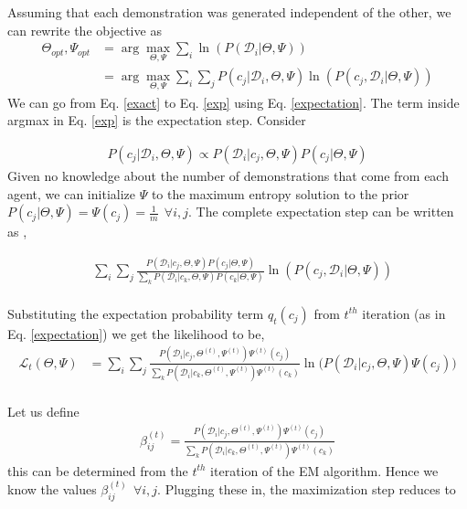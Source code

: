 \documentclass{article}[11pt]
\begin{document}
Assuming that each demonstration was generated independent of the other, we can rewrite the objective as 
\begin{align}
\label{exact}
\Theta_{opt}, \Psi_{opt} &= \arg \max_{\Theta,\Psi} \sum_i \ln( P(\mathcal{D}_i|\Theta,\Psi)) \\
\label{exp}
&= \arg \max_{\Theta,\Psi}\sum_i \sum_j P(c_j|\mathcal{D}_i, \Theta, \Psi) \ln(P(c_j,\mathcal{D}_i|\Theta,\Psi))
\end{align}
We can go from Eq. \ref{exact} to Eq. \ref{exp}  using Eq. \ref{expectation}. The term inside argmax in Eq. \ref{exp} is the expectation step.
Consider 

\begin{align*}
P(c_{j}|\mathcal{D}_i, \Theta,\Psi) \propto P(\mathcal{D}_i| c_{j},\Theta,\Psi)P(c_{j}|\Theta,\Psi)
\end{align*}
Given no knowledge about the number of demonstrations that come from each agent, we can initialize $\Psi$ to the maximum entropy solution to the prior $P(c_{j}|\Theta,\Psi) = \Psi(c_{j})= \frac{1}{m} \ \ \forall i,j $.
The complete expectation step can be written as ,

\begin{align*}
&\sum_i \sum_j \frac{P(\mathcal{D}_i| c_{j},\Theta,\Psi)P(c_{j}|\Theta,\Psi)}{\sum_k P(\mathcal{D}_i| c_{k},\Theta,\Psi)P(c_{k}|\Theta,\Psi)} \ln(P(c_{j},\mathcal{D}_i| \Theta,\Psi))
\end{align*}\\
Substituting the expectation probability term $q_t(c_j)$ from $t^{th}$ iteration (as in Eq. \ref{expectation}) we get the likelihood to be,
\begin{align*}
\mathcal{L}_t(\Theta,\Psi)&=\sum_i \sum_j \frac{P(\mathcal{D}_i| c_{j},\Theta^{(t)},\Psi^{(t)})\Psi^{(t)}(c_{j})}{\sum_k P(\mathcal{D}_i| c_{k},\Theta^{(t)},\Psi^{(t)})\Psi^{(t)}(c_{k})} \ln\big(P(\mathcal{D}_i| c_{j},\Theta,\Psi)\Psi(c_{j})\big)
\end{align*} \\
Let us define 
\begin{align}
\label{def_beta}
\beta_{ij}^{(t)} = \frac{P(\mathcal{D}_i| c_j,\Theta^{(t)},\Psi^{(t)})\Psi^{(t)}(c_{j})}{\sum_k P(\mathcal{D}_i| c_k,\Theta^{(t)},\Psi^{(t)})\Psi^{(t)}(c_{k})}
\end{align} this can be determined from the $t^{th}$ iteration of the EM algorithm. Hence we know the values $\beta_{ij}^{(t)} \ \ \forall i,j$. Plugging these in, the maximization step reduces to 
\end{document}
